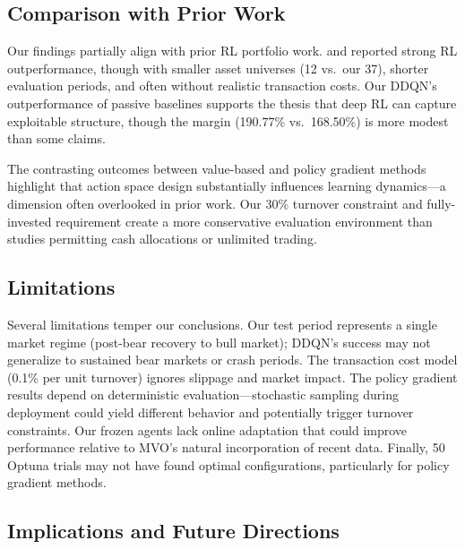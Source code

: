 \subsection{Comparison with Prior Work}
\label{sec:comparison_prior}

Our findings partially align with prior RL portfolio work. \citet{jiang2017eIIE} and \citet{ye2020sarl} reported strong RL outperformance, though with smaller asset universes (12 vs.\ our 37), shorter evaluation periods, and often without realistic transaction costs. Our DDQN's outperformance of passive baselines supports the thesis that deep RL can capture exploitable structure, though the margin (190.77\% vs.\ 168.50\%) is more modest than some claims.

The contrasting outcomes between value-based and policy gradient methods highlight that action space design substantially influences learning dynamics---a dimension often overlooked in prior work. Our 30\% turnover constraint and fully-invested requirement create a more conservative evaluation environment than studies permitting cash allocations or unlimited trading.

\subsection{Limitations}
\label{sec:limitations}

Several limitations temper our conclusions. Our test period represents a single market regime (post-bear recovery to bull market); DDQN's success may not generalize to sustained bear markets or crash periods. The transaction cost model (0.1\% per unit turnover) ignores slippage and market impact. The policy gradient results depend on deterministic evaluation---stochastic sampling during deployment could yield different behavior and potentially trigger turnover constraints. Our frozen agents lack online adaptation that could improve performance relative to MVO's natural incorporation of recent data. Finally, 50 Optuna trials may not have found optimal configurations, particularly for policy gradient methods.

\subsection{Implications and Future Directions}
\label{sec:future}

